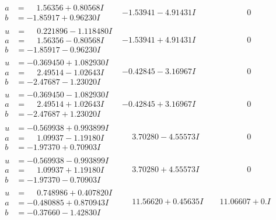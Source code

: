 \documentclass[1p]{elsarticle_modified}
\theoremstyle{definition}
\begin{document}
$$\begin{array}{c|c|c}
\begin{aligned}
a &= \phantom{-}1.56356 + 0.80568 I \\
b &= -1.85917 + 0.96230 I\end{aligned}
 & -1.53941 - 4.91431 I & \phantom{-0.000000 } 0 \\ \hline\begin{aligned}
u &= \phantom{-}0.221896 - 1.118480 I \\
a &= \phantom{-}1.56356 - 0.80568 I \\
b &= -1.85917 - 0.96230 I\end{aligned}
 & -1.53941 + 4.91431 I & \phantom{-0.000000 } 0 \\ \hline\begin{aligned}
u &= -0.369450 + 1.082930 I \\
a &= \phantom{-}2.49514 - 1.02643 I \\
b &= -2.47687 - 1.23020 I\end{aligned}
 & -0.42845 - 3.16967 I & \phantom{-0.000000 } 0 \\ \hline\begin{aligned}
u &= -0.369450 - 1.082930 I \\
a &= \phantom{-}2.49514 + 1.02643 I \\
b &= -2.47687 + 1.23020 I\end{aligned}
 & -0.42845 + 3.16967 I & \phantom{-0.000000 } 0 \\ \hline\begin{aligned}
u &= -0.569938 + 0.993899 I \\
a &= \phantom{-}1.09937 - 1.19180 I \\
b &= -1.97370 + 0.70903 I\end{aligned}
 & \phantom{-}3.70280 - 4.55573 I & \phantom{-0.000000 } 0 \\ \hline\begin{aligned}
u &= -0.569938 - 0.993899 I \\
a &= \phantom{-}1.09937 + 1.19180 I \\
b &= -1.97370 - 0.70903 I\end{aligned}
 & \phantom{-}3.70280 + 4.55573 I & \phantom{-0.000000 } 0 \\ \hline\begin{aligned}
u &= \phantom{-}0.748986 + 0.407820 I \\
a &= -0.480885 + 0.870943 I \\
b &= -0.37660 - 1.42830 I\end{aligned}
 & \phantom{-}11.56620 + 0.45635 I & \phantom{-}11.06607 + 0. I\phantom{ +0.000000I} \\ \hline\begin{aligned}

\end{aligned}
\end{array}$$
\end{document}
